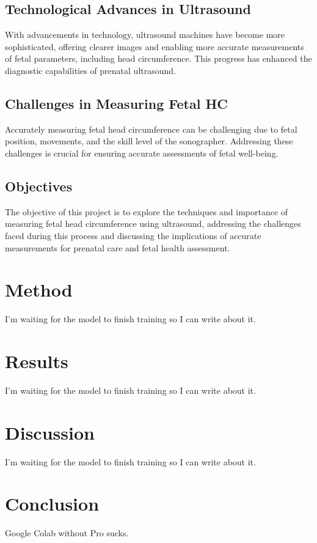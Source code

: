 \documentclass[conference]{IEEEtran}
\begin{document}
\subsection{Technological Advances in Ultrasound}
With advancements in technology, ultrasound machines have become more sophisticated, offering clearer images and enabling more accurate measurements of fetal parameters, including head circumference. This progress has enhanced the diagnostic capabilities of prenatal ultrasound.

\subsection{Challenges in Measuring Fetal HC}
Accurately measuring fetal head circumference can be challenging due to fetal position, movements, and the skill level of the sonographer. Addressing these challenges is crucial for ensuring accurate assessments of fetal well-being.

\subsection{Objectives}
The objective of this project is to explore the techniques and importance of measuring fetal head circumference using ultrasound, addressing the challenges faced during this process and discussing the implications of accurate measurements for prenatal care and fetal health assessment.

\section{Method}
I'm waiting for the model to finish training so I can write about it.

\section{Results}
I'm waiting for the model to finish training so I can write about it.

\section{Discussion}
I'm waiting for the model to finish training so I can write about it.

\section{Conclusion}
Google Colab without Pro sucks.
\end{document}
